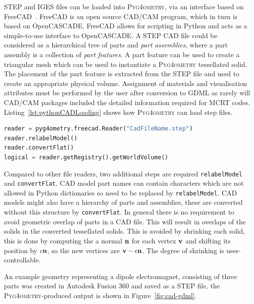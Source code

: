 \documentclass[final,5p,times,twocolumn]{elsarticle}
\newcommand{\pyinline}[1]{\lstinline[postbreak={}]{#1}}
\newcommand{\PYGEOMETRY}{\textsc{Pyg4ometry}}
\begin{document}
STEP and IGES files can be loaded into \PYGEOMETRY{}, via an interface 
based on FreeCAD~\cite{FreeCAD}. FreeCAD is an open source CAD/CAM program, which 
in turn is based on OpenCASCADE. FreeCAD allows for scripting in Python 
and acts as a simple-to-use interface to OpenCASCADE.  A STEP CAD file 
could be considered as a hierarchical tree of parts and \emph{part assemblies}, 
where a part assembly is a collection of \emph{part features}. A part feature can be used 
to create a triangular mesh which can be used to instantiate a \PYGEOMETRY{} tessellated solid. The placement 
of the part feature is extracted from the STEP file and used to create an 
appropriate physical volume. Assignment of materials and visualisation 
attributes must be performed by  the user after conversion to GDML as rarely 
will CAD/CAM packages included the detailed information required for MCRT 
codes. Listing~\ref{lst:pythonCADLoading} shows 
how \PYGEOMETRY{} can load step files.
\begin{lstlisting}[caption={A simple \PYGEOMETRY{} Python script to load a STEP file.},label={lst:pythonCADLoading}, language=Python]
reader = pyg4ometry.freecad.Reader("CadFileName.step")
reader.relabelModel()
reader.convertFlat()
logical = reader.getRegistry().getWorldVolume()
\end{lstlisting}
Compared to other file readers, two additional steps are required \pyinline{relabelModel} and \pyinline{convertFlat}. CAD model 
part names can contain characters which are not allowed in Python dictionaries so need to be replaced by \pyinline{relabelModel}. 
CAD models might also have a hierarchy of parts and assemblies, these are converted without this structure by \pyinline{convertFlat}.
In general there is no requirement to avoid geometric overlap  of parts in a CAD file. This will result in overlaps of the solids in 
the converted tessellated solids. This is avoided by shrinking each solid, this is done by computing the a normal ${\bf n}$  for each 
vertex ${\bf v}$ and shifting its position by $\epsilon {\bf n}$, so the new vertices are ${\bf v} - \epsilon {\bf n}$. The degree of shrinking 
is user-controllable. 

An example geometry representing a dipole electromagnet, consisting of three parts was created in Autodesk Fusion 360
and saved as a STEP file, the \PYGEOMETRY{}-produced output is shown in Figure~\ref{fig:cad-gdml}.
\end{document}
